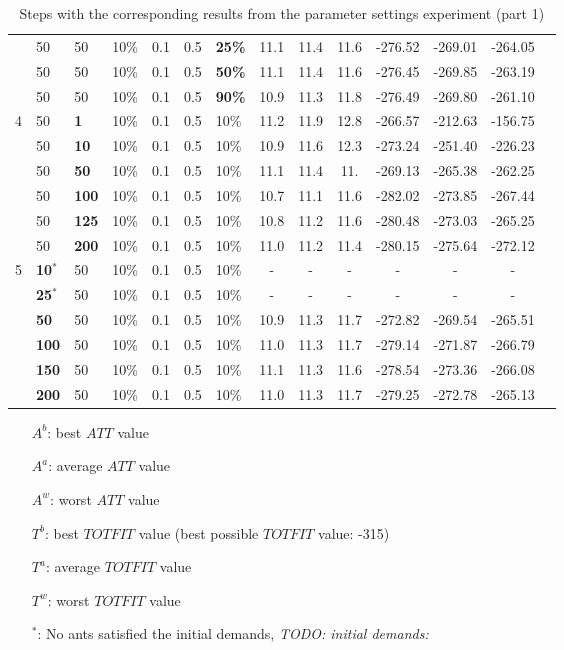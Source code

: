 \begin{table}
\begin{tabular}{|l|l|l|l|l|l|l||c|c|c|c|c|c|c|}
    ~ & 50 & 50 & 10\% & 0.1 & 0.5 & \textbf{25\%} & 11.1 & 11.4 & 11.6 & -276.52 & -269.01 & -264.05 \\
    ~ & 50 & 50 & 10\% & 0.1 & 0.5 & \textbf{50\%} & 11.1 & 11.4 & 11.6 & -276.45 & -269.85 & -263.19 \\
    ~ & 50 & 50 & 10\% & 0.1 & 0.5 & \textbf{90\%} &10.9 & 11.3 & 11.8 & -276.49 & -269.80 & -261.10 \\
    \hline
    4 & 50 & \textbf{1} & 10\% & 0.1 & 0.5 & 10\% &11.2 & 11.9 & 12.8 & -266.57 & -212.63 & -156.75 \\
    ~ & 50 & \textbf{10} & 10\% & 0.1 & 0.5 & 10\% & 10.9 & 11.6 & 12.3 & -273.24 & -251.40 & -226.23 \\
    ~ & 50 & \textbf{50} & 10\% & 0.1 & 0.5 & 10\% &  11.1 & 11.4 & 11. & -269.13 & -265.38 & -262.25 \\
    ~ & 50 & \textbf{100} & 10\% & 0.1 & 0.5 & 10\% & 10.7 & 11.1 & 11.6 & -282.02 & -273.85 & -267.44 \\
    ~ & 50 & \textbf{125} & 10\% & 0.1 & 0.5 & 10\% & 10.8 & 11.2 & 11.6 & -280.48 & -273.03 & -265.25 \\
    ~ & 50 & \textbf{200} & 10\% & 0.1 & 0.5 & 10\% & 11.0 & 11.2 & 11.4 & -280.15 & -275.64 & -272.12  \\
    \hline
    5 & \textbf{10$^*$} & 50 & 10\% & 0.1 & 0.5 & 10\% & - & - & - & - & - & - \\
    ~ & \textbf{25$^*$} & 50 & 10\% & 0.1 & 0.5 & 10\% & - & - & - & - & - & - \\
    ~ & \textbf{50} & 50 & 10\% & 0.1 & 0.5 & 10\% &10.9 & 11.3 & 11.7 & -272.82 & -269.54 & -265.51 \\
    ~ & \textbf{100} & 50 & 10\% & 0.1 & 0.5 & 10\% & 11.0 & 11.3 & 11.7 & -279.14 & -271.87 & -266.79 \\
    ~ & \textbf{150} & 50 & 10\% & 0.1 & 0.5 & 10\% & 11.1 & 11.3 & 11.6 & -278.54 & -273.36 & -266.08 \\
    ~ & \textbf{200} & 50 & 10\% & 0.1 & 0.5 & 10\% & 11.0 & 11.3 & 11.7 & -279.25 & -272.78 & -265.13 \\
    \hline
    \end{tabular}
    \caption {Steps with the corresponding results from the parameter settings experiment (part 1)}
    \tiny
    \begin{itemize}[noitemsep]
    \item[$A^b$:] best $ATT$ value
    \item[$A^a$:] average $ATT$ value
    \item[$A^w$:] worst $ATT$ value
    \item[$T^b$:] best $TOTFIT$ value (best possible $TOTFIT$ value: -315)
    \item[$T^a$:] average $TOTFIT$ value
    \item[$T^w$:] worst $TOTFIT$ value
    \item[$^*$:] No ants satisfied the initial demands, \emph{\color{blue} TODO: initial demands: }
    \end{itemize}
    \label{table:pm1}
\end{table}